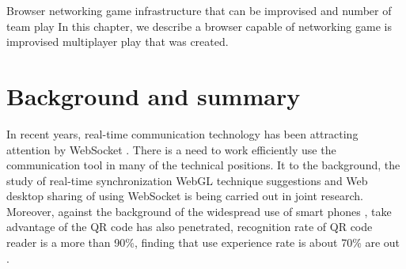 \chapterhead
{Browser networking game infrastructure that can be improvised and number of team play}
{In this chapter, we describe a browser capable of networking game is improvised multiplayer play that was created.}


\section{Background and summary}

In recent years, real-time communication technology has been attracting attention by WebSocket \cite{websocket}. There is a need to work efficiently use the communication tool in many of the technical positions. It to the background, the study of real-time synchronization WebGL technique suggestions \cite{websocket_webgl} and Web desktop sharing of using WebSocket \cite{weboscket_desktop} is being carried out in joint research. Moreover, against the background of the widespread use of smart phones \cite{smartphone_share}, take advantage of the QR code \cite{qrcode} has also penetrated, recognition rate of QR code reader is a more than 90\%, finding that use experience rate is about 70\% are out \cite{qrcoderesearch}.

